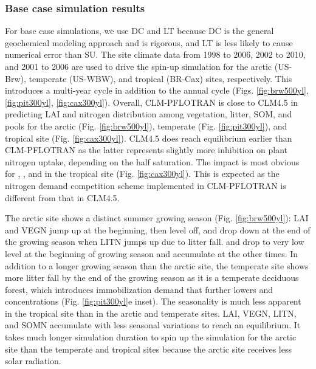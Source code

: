 \documentclass[gmd, manuscript]{copernicus}
\begin{document}
\subsubsection{Base case simulation results}
For base case simulations, we use DC  and LT because DC is the
general geochemical modeling approach and is rigorous, and LT is less likely to
cause numerical error than SU. The site climate data from 1998 to 2006, 2002 to
2010, and 2001 to 2006  are used to drive the spin-up simulation for the arctic (US-Brw),
temperate (US-WBW), and tropical (BR-Cax) sites, respectively. This introduces a multi-year cycle
in addition to the annual cycle (Figs. \ref{fig:brw500yl}, \ref{fig:pit300yl},
\ref{fig:cax300yl}). Overall, CLM-PFLOTRAN is close to CLM4.5 in
predicting LAI and nitrogen distribution among vegetation, litter, SOM,
 and  pools for the arctic (Fig. \ref{fig:brw500yl}),
temperate (Fig. \ref{fig:pit300yl}), and tropical site (Fig. \ref{fig:cax300yl}). %
CLM4.5 does reach equilibrium earlier than CLM-PFLOTRAN as the latter represents 
slightly more inhibition on plant nitrogen uptake, depending on the half
saturation. The impact is most obvious for , , and
 in the tropical site (Fig. \ref{fig:cax300yl}). This is expected as the nitrogen demand competition scheme implemented in CLM-PFLOTRAN is different
from that in CLM4.5. 

The arctic site shows a distinct summer growing season (Fig.
\ref{fig:brw500yl}): LAI and VEGN jump up at the beginning, then level off, and
drop down at the end of the growing season when LITN jumps up due to litter fall.
 and  drop to very low level at the beginning of
growing season and accumulate at the other times. In addition to a longer growing
season than the arctic site, the temperate site shows more litter fall by the
end of the growing season as it is a temperate deciduous forest, which introduces
immobilization demand that further lowers  and 
concentrations (Fig. \ref{fig:pit300yl}e inset). The seasonality is much less
apparent in the tropical site than in the arctic and temperate sites. LAI,
VEGN, LITN, and SOMN accumulate with less seasonal variations to reach an
equilibrium. It takes much longer simulation duration to spin up the simulation
for the arctic site than the temperate and tropical sites because the arctic site
receives less solar radiation. 
\end{document}
